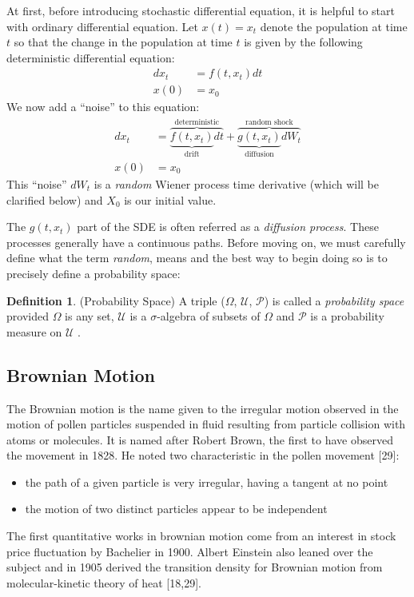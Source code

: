 \documentclass[12pt,twoside]{reedthesis}
\theoremstyle{definition}
\newtheorem{definition}{Definition}[section]
\theoremstyle{definition}
\theoremstyle{remark}
\begin{document}
  At first, before introducing stochastic differential equation, it is
  helpful to start with ordinary differential equation. Let \(x(t) = x_t\)
  denote the population at time \(t\) so that the change in the population
  at time \(t\) is given by the following deterministic differential
  equation:
  \begin{align}
  dx_t &= f(t, x_t)dt \\
  x(0) &= x_0 \nonumber
  \end{align}
  We now add a ``noise'' to this equation:
  \begin{align} \label{sde1}
  dx_t &= \overbrace{\underbrace{f(t, x_t)}_\text{drift}dt}^\text{deterministic} + \overbrace{\underbrace{g(t, x_t)}_\text{diffusion}dW_t}^\text{random shock} \\
  x(0) &= x_0 \nonumber
  \end{align}
  This ``noise'' \(dW_t\) is a \emph{random} Wiener process time
  derivative (which will be clarified below) and \(X_0\) is our initial
  value.
  
  The \(g(t, x_t)\) part of the SDE is often referred as a \emph{diffusion
  process}. These processes generally have a continuous paths. Before
  moving on, we must carefully define what the term \emph{random}, means
  and the best way to begin doing so is to precisely define a probability
  space:
  \begin{definition}{(Probability Space)} A triple ($\Omega$, $\mathcal {U}$, $\mathcal {P}$) is called a \textit{probability space} provided $\Omega$ is any set, $\mathcal {U}$ is a $\sigma$-algebra of subsets of $\Omega$ and $\mathcal {P}$ is a probability measure on $\mathcal {U}$ .
  \end{definition}
  \subsection{Brownian Motion}\label{brownian-motion}
  
  The Brownian motion is the name given to the irregular motion observed
  in the motion of pollen particles suspended in fluid resulting from
  particle collision with atoms or molecules. It is named after Robert
  Brown, the first to have observed the movement in 1828. He noted two
  characteristic in the pollen movement {[}29{]}:
  \begin{itemize}
  \item
    the path of a given particle is very irregular, having a tangent at no
    point
  \item
    the motion of two distinct particles appear to be independent
  \end{itemize}
  The first quantitative works in brownian motion come from an interest in
  stock price fluctuation by Bachelier in 1900. Albert Einstein also
  leaned over the subject and in 1905 derived the transition density for
  Brownian motion from molecular-kinetic theory of heat {[}18,29{]}.
  
\end{document}
